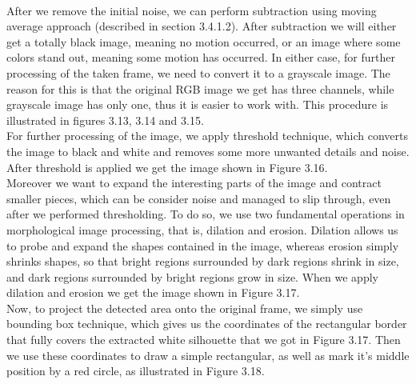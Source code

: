	\\After we remove the initial noise, we can perform subtraction using moving average approach (described in section 3.4.1.2). After subtraction we will either get a totally black image, meaning no motion occurred, or an image where some colors stand out, meaning some motion has occurred. In either case, for further processing of the taken frame, we need to convert it to a grayscale image. The reason for this is that the original RGB image we get has three channels, while grayscale image has only one, thus it is easier to work with. This procedure is illustrated in figures 3.13, 3.14 and 3.15. \\For further processing of the image, we apply threshold technique, which converts the image to black and white and removes some more unwanted details and noise. After threshold is applied we get the image shown in Figure 3.16. \\Moreover we want to expand the interesting parts of the image and contract smaller pieces, which can be consider noise and managed to slip through, even after we performed thresholding. To do so, we use two fundamental operations in morphological image processing, that is, dilation and erosion. Dilation allows us to probe and expand the shapes contained in the image, whereas erosion simply shrinks shapes, so that bright regions surrounded by dark regions shrink in size, and dark regions surrounded by bright regions grow in size. When we apply dilation and erosion we get the image shown in Figure 3.17. \\Now, to project the detected area onto the original frame, we simply use bounding box technique, which gives us the coordinates of the rectangular border that fully covers the extracted white silhouette that we got in Figure 3.17. Then we use these coordinates to draw a simple rectangular, as well as mark it's middle position by a red circle, as illustrated in Figure 3.18.
